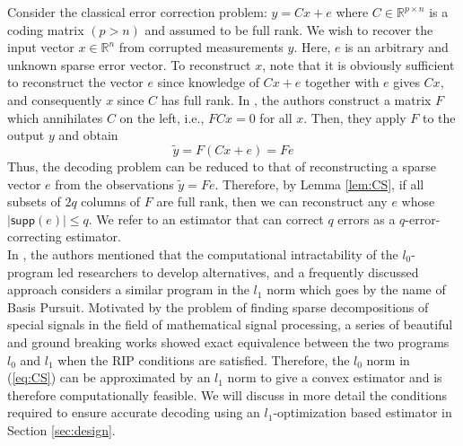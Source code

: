 \documentclass[twocolumn]{autart}    %
\newcommand{\rev}[1]{{\normalsize{{{\color{blue}#1}}}}}
\begin{document}
Consider the classical error correction problem: $y=Cx + e$ where $C\in \mathbb{R}^{p\times n}$ is a coding matrix $(p > n)$ and assumed to be full rank. We wish to recover the input vector $x \in \mathbb{R}^n$ from corrupted measurements $y$. Here, $e$ is an arbitrary and unknown sparse error vector. To reconstruct $x$, note that it is obviously sufficient to reconstruct the vector $e$ since knowledge of $Cx + e$ together with $e$ gives $Cx$, and consequently $x$ since $C$ has full rank. In \cite{Candes_Tao}, the authors construct a matrix $F$ which annihilates $C$ on the left, i.e.,  $FCx = 0$ for all $x$. Then, they apply $F$ to the output $y$ and obtain
\begin{equation}
	\tilde y = F (Cx + e) = Fe 
\end{equation}
Thus, the decoding problem can be reduced to that of reconstructing a sparse vector $e$ from the observations $\tilde y = Fe$. Therefore, by Lemma \ref{lem:CS}, if all subsets of $2q$ columns of $F$ are full rank, then we can reconstruct any $e$ whose  $\lvert \textsf{supp}(e) \rvert \le q$. We refer to an \rev{estimator} that can correct $q$ errors as a $q$-error-correcting \rev{estimator}.\\
In \cite{Candes_Tao}, the authors mentioned that the computational intractability of the $l_0$-program led researchers to develop alternatives, and a frequently discussed approach considers a similar program in the $l_1$ norm which goes by the name of Basis Pursuit. Motivated by the problem of finding sparse decompositions of special signals in the field of mathematical signal processing, a series of beautiful and ground breaking works \cite{Donoho2003, Elad2002, Gribonval2003, Tropp2004} showed exact equivalence between the two programs $l_0$ and $l_1$ when the RIP conditions are satisfied. Therefore, the $l_0$ norm in (\ref{eq:CS}) can be approximated by an $l_1$ norm to give a convex \rev{estimator} and is therefore computationally feasible. 
We will discuss in more detail the conditions required to ensure accurate decoding using an $l_1$-optimization based \rev{estimator} in Section \ref{sec:design}. 
\end{document}
